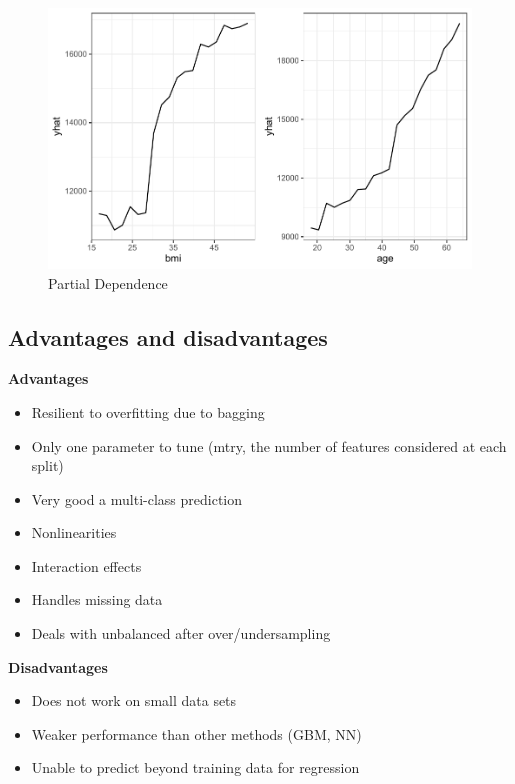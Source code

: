 \documentclass[openany]{book}
\providecommand{\tightlist}{%
  \setlength{\itemsep}{0pt}\setlength{\parskip}{0pt}}
\begin{document}
\begin{figure}
\centering
\includegraphics{06-tree-based-models_files/figure-latex/unnamed-chunk-19-1.pdf}
\caption{\label{fig:unnamed-chunk-19}Partial Dependence}
\end{figure}

\hypertarget{advantages-and-disadvantages-3}{%
\subsection{Advantages and disadvantages}\label{advantages-and-disadvantages-3}}

\textbf{Advantages}

\begin{itemize}
\tightlist
\item
  Resilient to overfitting due to bagging
\item
  Only one parameter to tune (mtry, the number of features considered at each split)
\item
  Very good a multi-class prediction
\item
  Nonlinearities
\item
  Interaction effects
\item
  Handles missing data
\item
  Deals with unbalanced after over/undersampling
\end{itemize}

\textbf{Disadvantages}

\begin{itemize}
\tightlist
\item
  Does not work on small data sets
\item
  Weaker performance than other methods (GBM, NN)
\item
  Unable to predict beyond training data for regression
\end{itemize}
\end{document}

